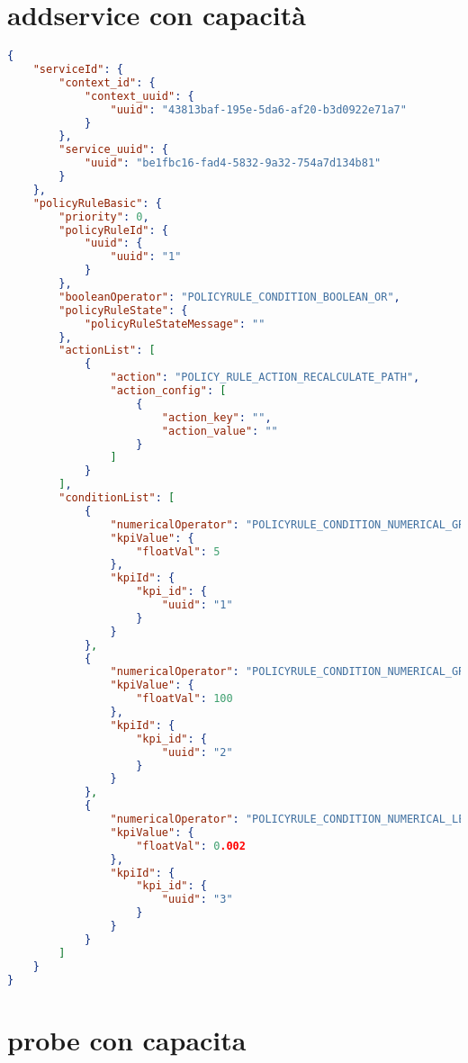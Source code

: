 \section{addservice con capacità}
\begin{lstlisting}[language=json]
{
    "serviceId": {
        "context_id": {
            "context_uuid": {
                "uuid": "43813baf-195e-5da6-af20-b3d0922e71a7"
            }
        },
        "service_uuid": {
            "uuid": "be1fbc16-fad4-5832-9a32-754a7d134b81"
        }
    },
    "policyRuleBasic": {
        "priority": 0,
        "policyRuleId": {
            "uuid": {
                "uuid": "1"
            }
        },
        "booleanOperator": "POLICYRULE_CONDITION_BOOLEAN_OR",
        "policyRuleState": {
            "policyRuleStateMessage": ""
        },
        "actionList": [
            {
                "action": "POLICY_RULE_ACTION_RECALCULATE_PATH",
                "action_config": [
                    {
                        "action_key": "",
                        "action_value": ""
                    }
                ]
            }
        ],
        "conditionList": [
            {
                "numericalOperator": "POLICYRULE_CONDITION_NUMERICAL_GREATER_THAN",
                "kpiValue": {
                    "floatVal": 5
                },
                "kpiId": {
                    "kpi_id": {
                        "uuid": "1"
                    }
                }
            },
            {
                "numericalOperator": "POLICYRULE_CONDITION_NUMERICAL_GREATER_THAN",
                "kpiValue": {
                    "floatVal": 100
                },
                "kpiId": {
                    "kpi_id": {
                        "uuid": "2"
                    }
                }
            },
            {
                "numericalOperator": "POLICYRULE_CONDITION_NUMERICAL_LESS_THAN",
                "kpiValue": {
                    "floatVal": 0.002
                },
                "kpiId": {
                    "kpi_id": {
                        "uuid": "3"
                    }
                }
            }
        ]
    }
}
\end{lstlisting}

\section{probe con capacita}
